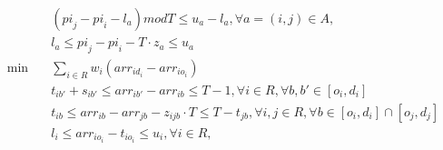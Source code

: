 \begin{align}
  & \left(\mathit{pi}_{j} - \mathit{pi}_{i} - l_{a}\right) \mathit{modT} \leq u_{a} - l_{a} , \forall a = \left(i , j\right) \in A , \tag{eq\_0001} \\
  & l_{a} \leq \mathit{pi}_{j} - \mathit{pi}_{i} - T \cdot z_{a} \leq u_{a} \tag{eq\_0002} \\
  \min\quad & \sum_{i \in R} w_{i} \left(\mathit{arr}_{i d_{i}} - \mathit{arr}_{i o_{i}}\right) \tag{eq\_0003} \\
  & t_{i b '} + s_{i b '} \leq \mathit{arr}_{i b '} - \mathit{arr}_{i b} \leq T - 1 , \forall i \in R , \forall b , b ' \in \left[o_{i} , d_{i}\right] \tag{eq\_0004} \\
  & t_{i b} \leq \mathit{arr}_{i b} - \mathit{arr}_{j b} - z_{i j b} \cdot T \leq T - t_{j b} , \forall i , j \in R , \forall b \in \left[o_{i} , d_{i}\right] \cap \left[o_{j} , d_{j}\right] \tag{eq\_0005} \\
  & l_{i} \leq \mathit{arr}_{i o_{i}} - t_{i o_{i}} \leq u_{i} , \forall i \in R , \tag{eq\_0006} \\
\end{align}
